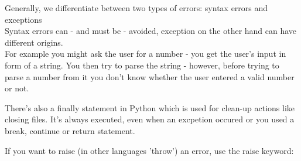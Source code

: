     Generally, we differentiate between two types of errors: syntax errors and exceptions \\
    Syntax errors can - and must be - avoided, exception on the other hand can have different
    origins. \\
    For example you might ask the user for a number - you get the user's input in form
    of a string. You then try to parse the string - however, before trying to parse a number from
    it you don't know whether the user entered a valid number or not.

    There's also a finally statement in Python which is used for clean-up actions like
    closing files. It's always executed, even when an excpetion occured or you used a break,
    continue or return statement.
    

    If you want to raise (in other languages 'throw') an error, use the raise keyword:

